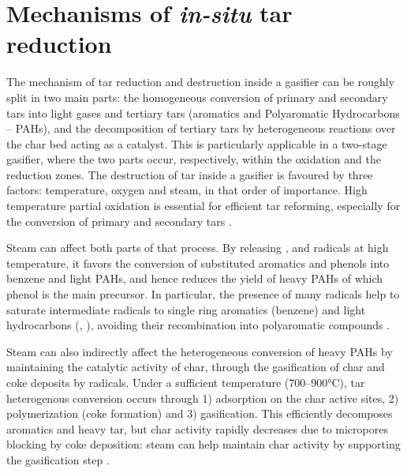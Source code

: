 \section{Mechanisms of \textit{in-situ} tar reduction}

The mechanism of tar reduction and destruction inside a gasifier can be roughly split in two main parts: the homogeneous conversion of primary and secondary tars into light gases and tertiary tars (aromatics and Polyaromatic Hydrocarbons -- PAHs), and the decomposition of tertiary tars by heterogeneous reactions over the char bed acting as a catalyst.  This is particularly applicable in a two-stage gasifier, where the two parts occur, respectively, within the oxidation and the reduction zones. The destruction of tar inside a gasifier is favoured by three factors: temperature, oxygen and steam, in that order of importance. High temperature partial oxidation is essential for efficient tar reforming, especially for the conversion of primary and secondary tars \cite{Zhang2010}. 

Steam can affect both parts of that process. By releasing ,  and  radicals at high temperature, it favors the conversion of substituted aromatics and phenols into benzene and light PAHs, and hence reduces the yield of heavy PAHs of which phenol is the main precursor. In particular, the presence of many  radicals help to saturate intermediate radicals to single ring aromatics (benzene) and light hydrocarbons (, ), avoiding their recombination into polyaromatic compounds \cite{Feng2017}.

Steam can also indirectly affect the heterogeneous conversion of heavy PAHs by maintaining the catalytic activity of char, through the gasification of char and coke deposits by  radicals. Under a sufficient temperature (700--900°C), tar heterogenous conversion occurs through 1) adsorption on the char active sites, 2) polymerization (coke formation) and 3) gasification.  This efficiently decomposes aromatics and heavy tar, but char activity rapidly decreases due to micropores blocking by coke deposition: steam can help maintain char activity by supporting the gasification step \cite{Hosokai2011}.


